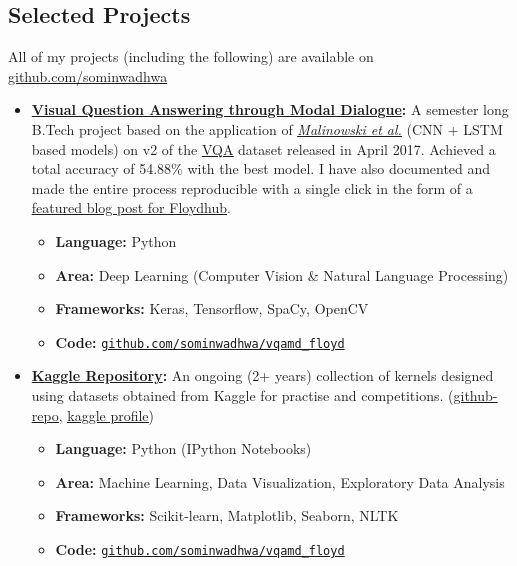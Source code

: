 \documentclass[margin,line]{res}
\begin{document}
\begin{resume}
\section{\sc Selected Projects}
All of my projects (including the following) are available on {\href{https://github.com/sominwadhwa}{github.com/sominwadhwa}}\\
\begin{itemize}[leftmargin=*]
\item {\bf {\href{https://github.com/sominwadhwa/vqamd_floyd}{Visual Question Answering through Modal Dialogue}:}}
A semester long B.Tech project based on the application of \textit{\href{https://arxiv.org/pdf/1505.01121.pdf}{\underline{Malinowski et al.}}} (CNN + LSTM based models) on v2 of the {\href{http://visualqa.org/}{\underline{VQA}}} dataset released in April 2017. Achieved a total accuracy of 54.88\% with the best model. I have also documented and made the entire process reproducible with a single click in the form of a \href{https://blog.floydhub.com/asking-questions-to-images-with-deep-learning/}{\underline{featured blog post for Floydhub}}.
\begin{itemize}[leftmargin=*]
\item {\bf Language:} Python
\item {\bf Area:} Deep Learning (Computer Vision \& Natural Language Processing)
\item {\bf Frameworks:} Keras, Tensorflow, SpaCy, OpenCV
\item {\bf Code:} {\href{https://github.com/sominwadhwa/vqamd_floyd}{\texttt{github.com/sominwadhwa/vqamd\_floyd}}}
\end{itemize}
\item {\bf {\href{https://github.com/sominwadhwa/Kaggle}{Kaggle Repository}:}}
An ongoing (2+ years) collection of kernels designed using datasets obtained from Kaggle for practise and competitions. ({\href{https://github.com/sominwadhwa/Kaggle}{\underline{github-repo}}}, {\href{https://www.kaggle.com/sominwadhwa}{\underline{kaggle profile}}})
\begin{itemize}[leftmargin=*]
\item {\bf Language:} Python (IPython Notebooks)
\item {\bf Area:} Machine Learning, Data Visualization, Exploratory Data Analysis
\item {\bf Frameworks:} Scikit-learn, Matplotlib, Seaborn, NLTK 
\item {\bf Code:} {\href{https://github.com/sominwadhwa/vqamd_floyd}{\texttt{github.com/sominwadhwa/vqamd\_floyd}}}

\end{itemize}
\end{itemize}
\end{resume}
\end{document}
